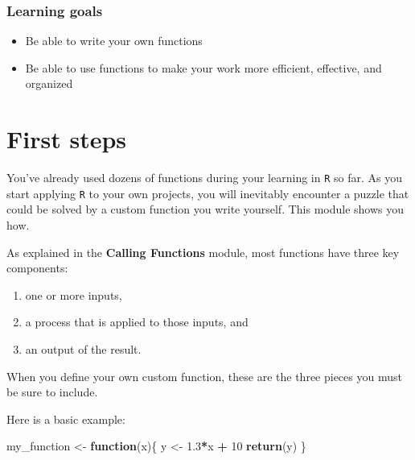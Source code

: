\documentclass[
]{book}
\newenvironment{Shaded}{\begin{snugshade}}{\end{snugshade}}
\newcommand{\ControlFlowTok}[1]{\textcolor[rgb]{0.13,0.29,0.53}{\textbf{#1}}}
\newcommand{\DecValTok}[1]{\textcolor[rgb]{0.00,0.00,0.81}{#1}}
\newcommand{\FloatTok}[1]{\textcolor[rgb]{0.00,0.00,0.81}{#1}}
\newcommand{\KeywordTok}[1]{\textcolor[rgb]{0.13,0.29,0.53}{\textbf{#1}}}
\newcommand{\NormalTok}[1]{#1}
\newcommand{\OperatorTok}[1]{\textcolor[rgb]{0.81,0.36,0.00}{\textbf{#1}}}
\newcommand{\StringTok}[1]{\textcolor[rgb]{0.31,0.60,0.02}{#1}}
\providecommand{\tightlist}{%
  \setlength{\itemsep}{0pt}\setlength{\parskip}{0pt}}
\begin{document}
\hypertarget{learning-goals-23}{%
\subsubsection*{Learning goals}\label{learning-goals-23}}

\begin{itemize}
\tightlist
\item
  Be able to write your own functions
\item
  Be able to use functions to make your work more efficient, effective, and organized
\end{itemize}

\hypertarget{first-steps}{%
\section*{First steps}\label{first-steps}}

You've already used dozens of functions during your learning in \texttt{R} so far. As you start applying \texttt{R} to your own projects, you will inevitably encounter a puzzle that could be solved by a custom function you write yourself. This module shows you how.

As explained in the \textbf{Calling Functions} module, most functions have three key components:

\begin{enumerate}
\def\labelenumi{(\arabic{enumi})}
\tightlist
\item
  one or more inputs,\\
\item
  a process that is applied to those inputs, and\\
\item
  an output of the result.
\end{enumerate}

When you define your own custom function, these are the three pieces you must be sure to include.

Here is a basic example:

\begin{Shaded}
\begin{Highlighting}[]
\NormalTok{my_function <-}\StringTok{ }\ControlFlowTok{function}\NormalTok{(x)\{}
\NormalTok{  y <-}\StringTok{ }\FloatTok{1.3}\OperatorTok{*}\NormalTok{x }\OperatorTok{+}\StringTok{ }\DecValTok{10}
  \KeywordTok{return}\NormalTok{(y)}
\NormalTok{\}}
\end{Highlighting}
\end{Shaded}
\end{document}
